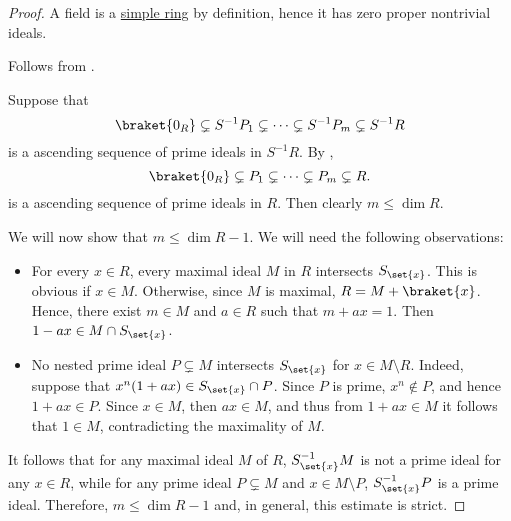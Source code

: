 \begin{proof}
   A field is a \hyperref[def:simple_object]{simple ring} by definition, hence it has zero proper nontrivial ideals.

   Follows from .

   Suppose that
  \begin{equation*}
    \braket{ 0_R } \subsetneq S^{-1} P_1 \subsetneq \cdots \subsetneq S^{-1} P_m \subsetneq S^{-1} R
  \end{equation*}
  is a ascending sequence of prime ideals in \( S^{-1} R \). By ,
  \begin{equation*}
    \braket{ 0_R } \subsetneq P_1 \subsetneq \cdots \subsetneq P_m \subsetneq R.
  \end{equation*}
  is a ascending sequence of prime ideals in \( R \). Then clearly \( m \leq \dim R \).

  We will now show that \( m \leq \dim R - 1 \). We will need the following observations:
  \begin{itemize}
    \item For every \( x \in R \), every maximal ideal \( M \) in \( R \) intersects \( S_{\set{ x }} \). This is obvious if \( x \in M \). Otherwise, since \( M \) is maximal, \( R = M + \braket{ x } \). Hence, there exist \( m \in M \) and \( a \in R \) such that \( m + ax = 1 \). Then \( 1 - ax \in M \cap S_{\set{ x }} \).

    \item No nested prime ideal \( P \subsetneq M \) intersects \( S_{\set{ x }} \) for \( x \in M \setminus R \). Indeed, suppose that \( x^n(1 + ax) \in S_{\set{ x }} \cap P \). Since \( P \) is prime, \( x^n \not\in P \), and hence \( 1 + ax \in P \). Since \( x \in M \), then \( ax \in M \), and thus from \( 1 + ax \in M \) it follows that \( 1 \in M \), contradicting the maximality of \( M \).
  \end{itemize}

  It follows that for any maximal ideal \( M \) of \( R \), \( S_{\set{ x }}^{-1} M \) is not a prime ideal for any \( x \in R \), while for any prime ideal \( P \subsetneq M \) and \( x \in M \setminus P \), \( S_{\set{ x }}^{-1} P \) is a prime ideal. Therefore, \( m \leq \dim R - 1 \) and, in general, this estimate is strict.



\end{proof}
